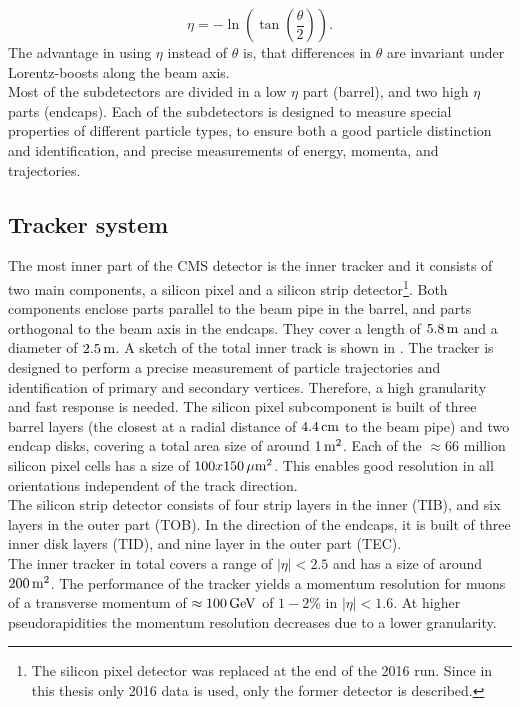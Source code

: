 \begin{equation}
 \eta=-\ln\left(\tan\left(\frac{\theta}{2}\right)\right).
\end{equation}
The advantage in using $\eta$ instead of $\theta$ is, that differences in $\theta$ are invariant under Lorentz-boosts along the beam axis.\\
Most of the subdetectors are divided in a low $\eta$ part (barrel), and two high $\eta$ parts (endcaps). Each of the subdetectors is designed to measure special properties of different particle types, to ensure both a good particle distinction and identification, and precise measurements of energy, momenta, and trajectories.



\subsection{Tracker system}
The most inner part of the CMS detector is the inner tracker and it consists of two main components, a silicon pixel and a silicon strip detector\footnote{The silicon pixel detector was replaced at the end of the 2016 run. Since in this thesis only 2016 data is used, only the former detector is described.}. Both components enclose parts parallel to the beam pipe in the barrel, and parts orthogonal to the beam axis in the endcaps. They cover a length of $5.8\,\text{m}$ and a diameter of $2.5\,\text{m}$. A sketch of the total inner track is shown in . The tracker is designed to perform a precise measurement of particle trajectories and identification of primary and secondary vertices. Therefore, a high granularity and fast response is needed. The silicon pixel subcomponent is built of three barrel layers (the closest at a radial distance of $4.4\,\text{cm}$ to the beam pipe) and two endcap disks, covering a total area size of around $1\,\text{m}^2$. Each of the $\approx66$ million silicon pixel cells has a size of $100x150\,\mu\text{m}^2$. This enables good resolution in all orientations independent of the track direction.\\
The silicon strip detector consists of four strip layers in the inner (TIB), and six layers in the outer part (TOB). In the direction of the endcaps, it is built of three inner disk layers (TID), and nine layer in the outer part (TEC).\\
The inner tracker in total covers a range of $|\eta|<2.5$ and has a size of around $200\,\text{m}^2$. The performance of the tracker yields a momentum resolution for muons of a transverse momentum of $\approx100\,\text{Ge\hspace{-.08em}V}$ of $1-2\%$ in $|\eta|<1.6$. At higher pseudorapidities the momentum resolution decreases due to a lower granularity.

